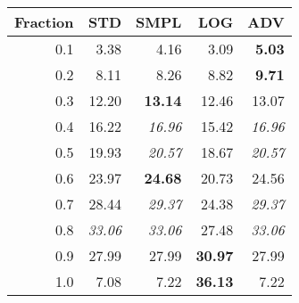 \documentclass{standalone}
\begin{document}
\begin{tabular}{r|rrrr}
      \toprule
      Fraction & STD & SMPL & LOG & ADV\\
      \midrule
      0.1 & 3.38 & 4.16 & 3.09 & \textbf{5.03}\\
  0.2 & 8.11 & 8.26 & 8.82 & \textbf{9.71}\\
  0.3 & 12.20 & \textbf{13.14} & 12.46 & 13.07\\
  0.4 & 16.22 & \emph{16.96} & 15.42 & \emph{16.96}\\
  0.5 & 19.93 & \emph{20.57} & 18.67 & \emph{20.57}\\
  0.6 & 23.97 & \textbf{24.68} & 20.73 & 24.56\\
  0.7 & 28.44 & \emph{29.37} & 24.38 & \emph{29.37}\\
  0.8 & \emph{33.06} & \emph{33.06} & 27.48 & \emph{33.06}\\
  0.9 & 27.99 & 27.99 & \textbf{30.97} & 27.99\\
  1.0 & 7.08 & 7.22 & \textbf{36.13} & 7.22\\
  \bottomrule
\end{tabular}
\end{document}
